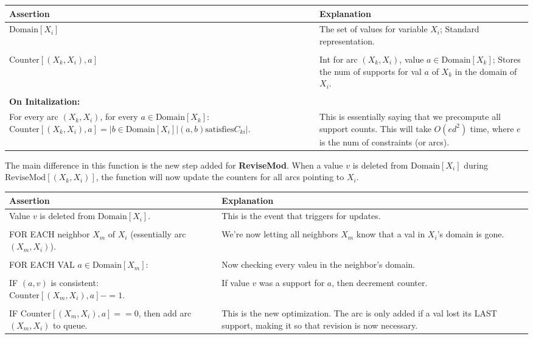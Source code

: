 \documentclass[11pt]{article}
\newenvironment{answercols}
  {\begin{center}\begin{tabular}{p{0.45\textwidth}p{0.45\textwidth}}
   \toprule
   \textbf{Assertion} & \textbf{Explanation} \\
   \midrule}
  {\\ \bottomrule\end{tabular}\end{center}}
\begin{document}
    \begin{answercols}
        $\text{Domain}[X_i]$ &
        The set of values for variable $X_i$; Standard representation. \\
        \\
        $\text{Counter}[(X_k, X_i), a]$ &
        Int for arc $(X_k, X_i)$, value $a \in \text{Domain}[X_k]$; Stores the num of supports for val $a$ of $X_k$ in the domain of $X_i$. \\
        \\
        \textbf{On Initalization: } \\
        For every arc $(X_k, X_i)$, for every $a \in \text{Domain}[X_k]$: $\text{Counter}[(X_k, X_i), a] = { | b \in \text{Domain}[X_i] | (a, b) \text{satisfies} C_{ki} } |$. &
        This is essentially saying that we precompute all support counts. This will take $O(ed^2)$ time, where $e$ is the num of constraints (or arcs).
    \end{answercols}

    \newpage

    \noindent The main difference in this function is the new step added for \textbf{ReviseMod}. When a value $v$ is deleted from $\text{Domain}[X_i]$ during $\text{ReviseMod}[(X_k, X_i)]$, the function will now update the counters for all arcs pointing to $X_i$. \\
    
    \begin{answercols}
        Value $v$ is deleted from $\text{Domain}[X_i]$. &
        This is the event that triggers for updates. \\
        \\
        FOR EACH neighbor $X_m$ of $X_i$ (essentially arc $(X_m, X_i)$). &
        We're now letting all neighbors $X_m$ know that a val in $X_{i}$'s domain is gone. \\
        \\
        FOR EACH VAL $a \in \text{Domain}[X_m]$: &
        Now checking every valeu in the neighbor's domain. \\
        \\
        IF $(a, v)$ is consistent: $\text{Counter}[(X_m, X_i), a] -= 1$. &
        If value $v$ was a support for $a$, then decrement counter. \\
        \\
        IF $\text{Counter}[(X_m, X_i), a] == 0$, then add arc $(X_m, X_i)$ to queue. &
        This is the new optimization. The arc is only added if a val lost its LAST support, making it so that revision is now necessary.
    \end{answercols}
\end{document}
